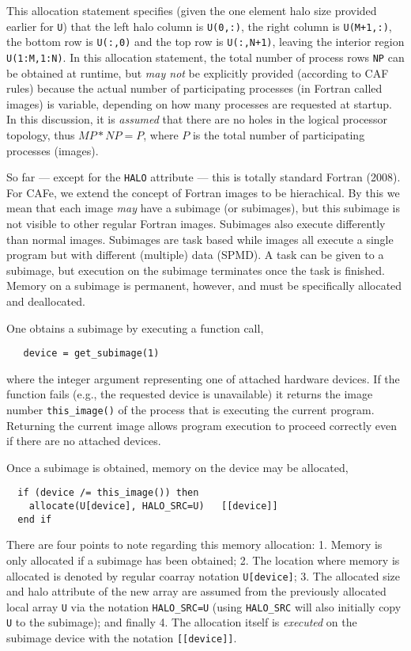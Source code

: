 This allocation statement specifies (given the one element halo size provided earlier for
\texttt{U}) that the left halo column is \texttt{U(0,:)}, the right column is \texttt{U(M+1,:)}, the
bottom row is \texttt{U(:,0)} and the top row is \texttt{U(:,N+1)}, leaving the interior region
\texttt{U(1:M,1:N)}.  In this allocation statement, the total number of process rows \texttt{NP} can
be obtained at runtime, but \emph{may not} be explicitly provided (according to CAF rules) because the
actual number of participating processes (in Fortran called images) is variable, depending on how
many processes are requested at startup.  In this discussion, it is \emph{assumed} that there are no
holes in the logical processor topology, thus $MP*NP = P$, where $P$ is the total number of
participating processes (images).

So far --- except for the \texttt{HALO} attribute --- this is totally standard Fortran (2008).  For CAFe,
we extend the concept of Fortran images to be hierachical.  By this we mean that each image \emph{may}
have a subimage (or subimages), but this subimage is not visible to other regular Fortran images.
Subimages also execute differently than normal images.  Subimages are task based while images all
execute a single program but with different (multiple) data (SPMD).  A task can be given to a subimage,
but execution on the subimage terminates once the task is finished.  Memory on a subimage is
permanent, however, and must be specifically allocated and deallocated.

One obtains a subimage by executing a function call,
\begin{verbatim}
   device = get_subimage(1)
\end{verbatim}
where the integer argument representing one of attached hardware devices.  If the function
fails (e.g., the requested device is unavailable) it returns the image number
\texttt{this\_image()} of the process that is executing the current program.  Returning
the current image allows program execution to proceed correctly even if there are no
attached devices.

Once a subimage is obtained, memory on the device may be allocated,
\begin{verbatim}
  if (device /= this_image()) then
    allocate(U[device], HALO_SRC=U)   [[device]]
  end if
\end{verbatim}
There are four points to note regarding this memory allocation: 1. Memory is only allocated if a
subimage has been obtained; 2. The location where memory is allocated is denoted by regular coarray
notation \texttt{U[device]}; 3. The allocated size and halo attribute of the new array are assumed
from the previously allocated local array \texttt{U} via the notation \texttt{HALO\_SRC=U} (using
\texttt{HALO\_SRC} will also initially copy \texttt{U} to the subimage); and finally 4. The
allocation itself is \emph{executed} on the subimage device with the notation \texttt{[[device]]}.

